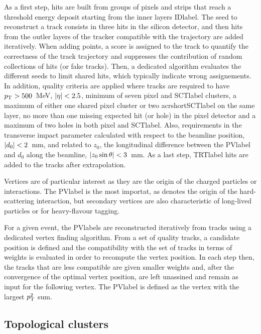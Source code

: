 As a first step, hits are built from groups of pixels and strips that reach a threshold energy deposit starting from the inner layers \acrshort{IDlabel}. The seed to reconstruct a track consists in three hits in the silicon detector, and then hits from the outler layers of the tracker compatible with the trajectory are added iteratively. When adding points, a score is assigned to the track to quantify the correctness of the track trajectory and suppresses the contribution of random collections of hits (or fake tracks). Then, a dedicated algorithm evaluates the different seeds to limit shared hits, which typically indicate wrong assignements. In addition, quality criteria are applied where tracks are required to have $p_{\text{T}}>500$~MeV, $\abs{\eta}<2.5$, minimum of seven pixel and \acrshort{SCTlabel} clusters, a maximum of either one shared pixel cluster or two acrshort{SCTlabel} on the same layer, no more than one missing expected hit (or hole) in the pixel detector and a maximum of two holes in both pixel and \acrshort{SCTlabel}. Also, requirements in the transverse impact parameter calculated with respect to the beamline position, $\abs{d_0}<2$~mm, and related to $z_0$, the longitudinal difference between the \acrshort{PVlabel} and $d_0$ along the beamline, $\abs{z_0 \sin\theta} <3$~mm. As a last step, \acrshort{TRTlabel} hits are added to the tracks after extrapolation.

Vertices are of particular interest as they are the origin of the charged particles or interactions. The \acrshort{PVlabel} is the most importat, as denotes the origin of the hard-scattering interaction, but secondary vertices are also characteristic of long-lived particles or for heavy-flavour tagging.

For a given event, the \acrshort{PVlabel}s are reconstructed iteratively from tracks using a dedicated vertex finding algorithm. From a set of quality tracks, a candidate position is defined and the compatibility with the set of tracks in terms of weights is evaluated in order to recompute the vertex position. In each step then, the tracks that are less compatible are given smaller weights and, after the convergence of the optimal vertex position, are left unassined and remain as input for the following vertex. The \acrshort{PVlabel} is defined as the vertex with the largest $p_{\text{T}}^2$ sum. 

\subsection{Topological clusters}

